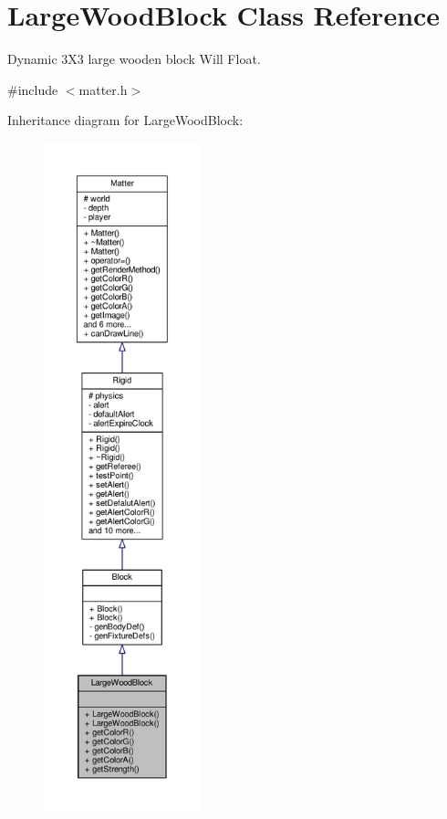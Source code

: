 \hypertarget{classLargeWoodBlock}{}\section{Large\+Wood\+Block Class Reference}
\label{classLargeWoodBlock}


Dynamic 3\+X3 large wooden block Will Float.  




{\ttfamily \#include $<$matter.\+h$>$}



Inheritance diagram for Large\+Wood\+Block\+:
\nopagebreak
\begin{figure}[H]
\begin{center}
\leavevmode
\includegraphics[height=550pt]{classLargeWoodBlock__inherit__graph}
\end{center}
\end{figure}


